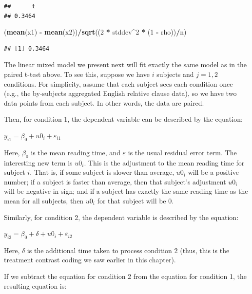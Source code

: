 \documentclass[12pt,]{krantz}
\newenvironment{Shaded}{\begin{snugshade}}{\end{snugshade}}
\newcommand{\DecValTok}[1]{\textcolor[rgb]{0.00,0.00,0.81}{#1}}
\newcommand{\KeywordTok}[1]{\textcolor[rgb]{0.13,0.29,0.53}{\textbf{#1}}}
\newcommand{\NormalTok}[1]{#1}
\newcommand{\OperatorTok}[1]{\textcolor[rgb]{0.81,0.36,0.00}{\textbf{#1}}}
\newcommand{\StringTok}[1]{\textcolor[rgb]{0.31,0.60,0.02}{#1}}
\begin{document}
\begin{verbatim}
##      t 
## 0.3464
\end{verbatim}

\begin{Shaded}
\begin{Highlighting}[]
\NormalTok{(}\KeywordTok{mean}\NormalTok{(x1) }\OperatorTok{-}\StringTok{ }\KeywordTok{mean}\NormalTok{(x2))}\OperatorTok{/}\KeywordTok{sqrt}\NormalTok{((}\DecValTok{2} \OperatorTok{*}\StringTok{ }\NormalTok{stddev}\OperatorTok{^}\DecValTok{2} \OperatorTok{*}\StringTok{ }\NormalTok{(}\DecValTok{1} \OperatorTok{-}\StringTok{ }\NormalTok{rho))}\OperatorTok{/}\NormalTok{n)}
\end{Highlighting}
\end{Shaded}

\begin{verbatim}
## [1] 0.3464
\end{verbatim}

The linear mixed model we present next will fit exactly the same model as in the paired t-test above. To see this, suppose we have \(i\) subjects and \(j=1,2\) conditions. For simplicity, assume that each subject sees each condition once (e.g., the by-subjects aggregated English relative clause data), so we have two data points from each subject. In other words, the data are paired.

Then, for condition 1, the dependent variable can be described by the equation:

\(y_{i1} = \beta_0 + u0_i + \varepsilon_{i1}\)

Here, \(\beta_0\) is the mean reading time, and \(\varepsilon\) is the usual residual error term. The interesting new term is \(u0_i\). This is the adjustment to the mean reading time for subject \(i\). That is, if some subject is slower than average, \(u0_i\) will be a positive number; if a subject is faster than average, then that subject's adjustment \(u0_i\) will be negative in sign; and if a subject has exactly the same reading time as the mean for all subjects, then \(u0_i\) for that subject will be 0.

Similarly, for condition 2, the dependent variable is described by the equation:

\(y_{i2} = \beta_0 + \delta + u0_i + \varepsilon_{i2}\)

Here, \(\delta\) is the additional time taken to process condition 2 (thus, this is the treatment contrast coding we saw earlier in this chapter).

If we subtract the equation for condition 2 from the equation for condition 1, the resulting equation is:
\end{document}
